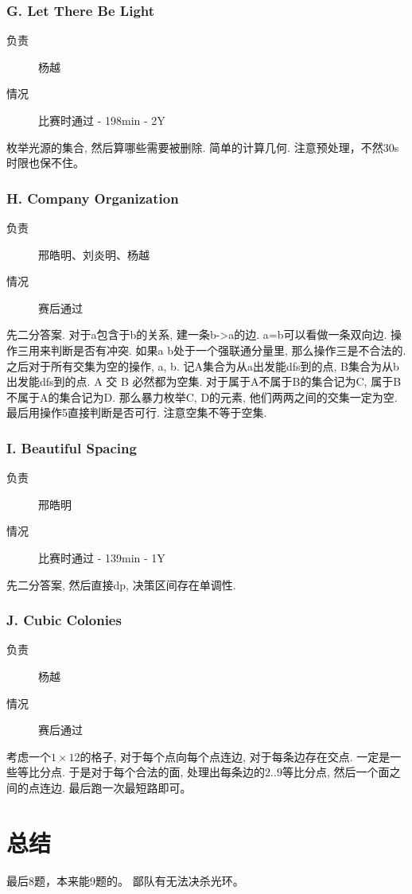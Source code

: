 \documentclass[a4paper, 11pt, nofonts, nocap, fancyhdr]{ctexart}
\newcommand{\problem}[1]{\subsubsection{#1}}
\begin{document}
\problem{G. Let There Be Light}

\begin{description}
\item[负责] 杨越
\item[情况] 比赛时通过 - 198min - 2Y
\end{description}

枚举光源的集合, 然后算哪些需要被删除.
简单的计算几何.
注意预处理，不然30s时限也保不住。

\problem{H. Company Organization}

\begin{description}
\item[负责] 邢皓明、刘炎明、杨越
\item[情况] 赛后通过
\end{description}

先二分答案.
对于a包含于b的关系, 建一条b->a的边.
a=b可以看做一条双向边.
操作三用来判断是否有冲突. 如果a b处于一个强联通分量里, 那么操作三是不合法的.
之后对于所有交集为空的操作, a, b. 记A集合为从a出发能dfs到的点, B集合为从b出发能dfs到的点. A 交 B 必然都为空集. 对于属于A不属于B的集合记为C, 属于B不属于A的集合记为D. 那么暴力枚举C, D的元素, 他们两两之间的交集一定为空. 
最后用操作5直接判断是否可行.
注意空集不等于空集.

\problem{I. Beautiful Spacing}

\begin{description}
\item[负责] 邢皓明
\item[情况] 比赛时通过 - 139min - 1Y
\end{description}

先二分答案, 然后直接dp, 决策区间存在单调性. 

\problem{J. Cubic Colonies}

\begin{description}
\item[负责] 杨越
\item[情况] 赛后通过
\end{description}

考虑一个$1\times 12$的格子, 对于每个点向每个点连边, 对于每条边存在交点. 一定是一些等比分点. 于是对于每个合法的面, 处理出每条边的$2..9$等比分点, 然后一个面之间的点连边. 最后跑一次最短路即可。

\section{总结}

最后8题，本来能9题的。
鄙队有无法决杀光环。
\end{document}
